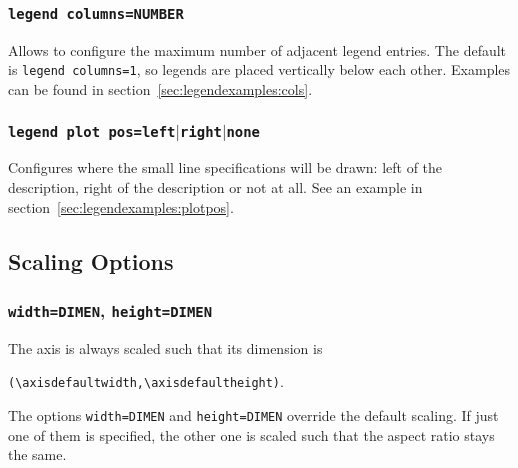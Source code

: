 \subsubsection{\texttt{legend columns=NUMBER}}
Allows to configure the maximum number of adjacent legend entries. The default is \texttt{legend columns=1}, so legends are placed vertically below each other. Examples can be found in section~\ref{sec:legendexamples:cols}.

\subsubsection{\texttt{legend plot pos=left$|$right$|$none}}
Configures where the small line specifications will be drawn: left of the description, right of the description or not at all. See an example in section~\ref{sec:legendexamples:plotpos}.



\subsection{Scaling Options}

\subsubsection{\texttt{width=DIMEN}, \texttt{height=DIMEN}}
The axis is always scaled such that its dimension is 

{\centering\lstinline!(\axisdefaultwidth,\axisdefaultheight)!.

}%
\noindent
The options \lstinline!width=DIMEN! and \lstinline!height=DIMEN! override the default scaling. If just one of them is specified, the other one is scaled such that the aspect ratio stays the same.

